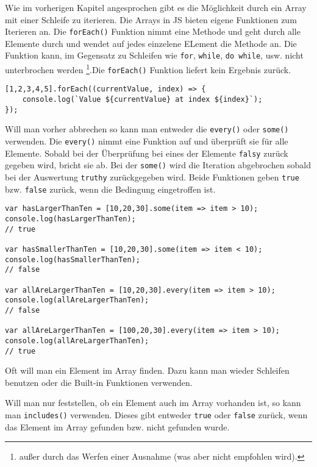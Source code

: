 \documentclass{book}
\begin{document}
Wie im vorherigen Kapitel angesprochen gibt es die Möglichkeit durch ein Array mit einer Schleife zu iterieren. Die Arrays in JS bieten eigene Funktionen zum Iterieren an. Die \lstinline|forEach()| Funktion nimmt eine Methode und geht durch alle Elemente durch und wendet auf jedes einzelene ELement die Methode an. Die Funktion kann, im Gegensatz zu Schleifen wie \lstinline|for|, \lstinline|while|, \lstinline|do while|, usw. nicht unterbrochen werden \footnote{außer durch das Werfen einer Ausnahme (was aber nicht empfohlen wird).}.Die \lstinline|forEach()| Funktion liefert kein Ergebnis zurück.

\begin{lstlisting}[caption=Array Konstruktor]
[1,2,3,4,5].forEach((currentValue, index) => {
	console.log(`Value ${currentValue} at index ${index}`);
});
\end{lstlisting}

Will man vorher abbrechen so kann man entweder die \lstinline|every()| oder \lstinline|some()| verwenden. Die \lstinline|every()| nimmt eine Funktion auf und überprüft sie für alle Elemente. Sobald bei der Überprüfung bei eines der Elemente \lstinline|falsy| zurück gegeben wird, bricht sie ab. Bei der \lstinline|some()| wird die Iteration abgebrochen sobald bei der Auswertung \lstinline|truthy| zurückgegeben wird. Beide Funktionen geben \lstinline|true| bzw. \lstinline|false| zurück, wenn die Bedingung eingetroffen ist.

\begin{lstlisting}[caption=Array Konstruktor]
var hasLargerThanTen = [10,20,30].some(item => item > 10);
console.log(hasLargerThanTen);
// true

var hasSmallerThanTen = [10,20,30].some(item => item < 10);
console.log(hasSmallerThanTen);
// false

var allAreLargerThanTen = [10,20,30].every(item => item > 10);
console.log(allAreLargerThanTen);
// false

var allAreLargerThanTen = [100,20,30].every(item => item > 10);
console.log(allAreLargerThanTen);
// true
\end{lstlisting}

Oft will man ein Element im Array finden. Dazu kann man wieder Schleifen benutzen oder die Built-in Funktionen verwenden. 

Will man nur feststellen, ob ein Element auch im Array vorhanden ist, so kann man \lstinline|includes()| verwenden. Dieses gibt entweder \lstinline|true| oder \lstinline|false| zurück, wenn das Element im Array gefunden bzw. nicht gefunden wurde.
\end{document}
